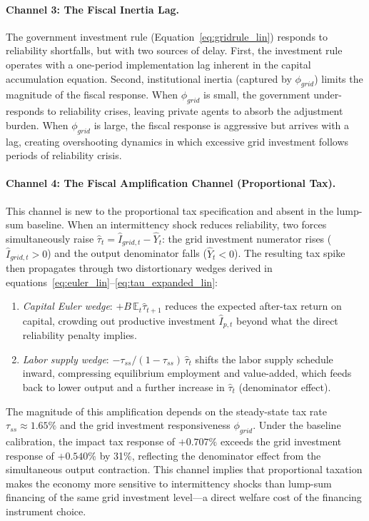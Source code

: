 \documentclass[12pt, a4paper]{article}
\begin{document}
\paragraph{Channel 3: The Fiscal Inertia Lag.}
The government investment rule (Equation~\ref{eq:gridrule_lin}) responds to reliability shortfalls, but with two sources of delay. First, the investment rule operates with a one-period implementation lag inherent in the capital accumulation equation. Second, institutional inertia (captured by $\phi_{grid}$) limits the magnitude of the fiscal response. When $\phi_{grid}$ is small, the government under-responds to reliability crises, leaving private agents to absorb the adjustment burden. When $\phi_{grid}$ is large, the fiscal response is aggressive but arrives with a lag, creating overshooting dynamics in which excessive grid investment follows periods of reliability crisis.

\paragraph{Channel 4: The Fiscal Amplification Channel (Proportional Tax).}
This channel is new to the proportional tax specification and absent in the lump-sum baseline. When an intermittency shock reduces reliability, two forces simultaneously raise $\hat{\tau}_t = \hat{I}_{grid,t} - \hat{Y}_t$: the grid investment numerator rises ($\hat{I}_{grid,t} > 0$) and the output denominator falls ($\hat{Y}_t < 0$). The resulting tax spike then propagates through two distortionary wedges derived in equations~\eqref{eq:euler_lin}--\eqref{eq:tau_expanded_lin}:

\begin{enumerate}
    \item \textit{Capital Euler wedge}: $+B\,\mathbb{E}_t\hat{\tau}_{t+1}$ reduces the expected after-tax return on capital, crowding out productive investment $\hat{I}_{p,t}$ beyond what the direct reliability penalty implies.
    \item \textit{Labor supply wedge}: $-\tau_{ss}/(1-\tau_{ss})\,\hat{\tau}_t$ shifts the labor supply schedule inward, compressing equilibrium employment and value-added, which feeds back to lower output and a further increase in $\hat{\tau}_t$ (denominator effect).
\end{enumerate}

The magnitude of this amplification depends on the steady-state tax rate $\tau_{ss} \approx 1.65\%$ and the grid investment responsiveness $\phi_{grid}$. Under the baseline calibration, the impact tax response of $+0.707\%$ exceeds the grid investment response of $+0.540\%$ by 31\%, reflecting the denominator effect from the simultaneous output contraction. This channel implies that proportional taxation makes the economy more sensitive to intermittency shocks than lump-sum financing of the same grid investment level---a direct welfare cost of the financing instrument choice.
\end{document}
